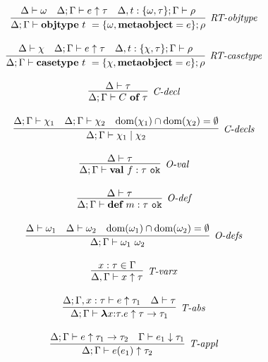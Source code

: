 \begin{figure}
\centering
\[
\begin{array}{c}

\infer[\textit{RT-objtype}]
	{\Delta; \Gamma \vdash  \keyw{objtype}~ t~=\{{\omega}, \keyw{metaobject}=e\}; \rho} 
	{\Delta \vdash \omega & \Delta; \Gamma \vdash e \uparrow\tau & \Delta, t:\{\omega,\tau\}; \Gamma \vdash \rho }\\[3ex]

\infer[\textit{RT-casetype}]
	{\Delta; \Gamma \vdash  \keyw{casetype}~ t~=\{\chi, \keyw{metaobject}=e\}; \rho} 
	{\Delta \vdash \chi & \Delta; \Gamma \vdash e \uparrow\tau & \Delta, t:\{\chi,\tau\}; \Gamma \vdash \rho  }\\[3ex]

\infer[\textit{C-decl}]
	{\Delta; \Gamma \vdash  C~\keyw{of}~\tau} 
	{\Delta \vdash \tau   }\\[3ex]

\infer[\textit{C-decls}]
	{\Delta; \Gamma \vdash  \chi_1 \bnfalt \chi_2} 
	{\Delta; \Gamma \vdash \chi_1 & \Delta; \Gamma \vdash \chi_2 & \text{dom}(\chi_1) \intersect \text{dom}(\chi_2) = \emptyset}\\[3ex]

\infer[\textit{O-val}]
	{\Delta; \Gamma \vdash \keyw{val}~ f:\tau \ \texttt{ok} }
	{\Delta \vdash \tau} \\[3ex]
	
\infer[\textit{O-def}]
	{\Delta; \Gamma \vdash \keyw{def}~ m:\tau \ \texttt{ok} }
	{\Delta \vdash \tau } \\[3ex]

\infer[\textit{O-defs}]
	{\Delta; \Gamma \vdash \omega_1\ \omega_2  }
	{\Delta \vdash \omega_1 & \Delta \vdash \omega_2 & \text{dom}(\omega_1) \intersect \text{dom}(\omega_2) = \emptyset } \\[3ex]
	
\infer[\textit{T-varx}]
	{\Delta,\Gamma \vdash x\uparrow\tau } 
	{x:\tau \in \Gamma }\\[3ex]

\infer[\textit{T-abs}]
	{\Delta; \Gamma \vdash  \boldsymbol\lambda x{:}\tau . e \uparrow \tau \rightarrow \tau_1} 
	{\Delta; \Gamma, x:\tau \vdash e\uparrow\tau_1  & \Delta\vdash \tau}\\[3ex]

\infer[\textit{T-appl}]
	{\Delta; \Gamma \vdash  e(e_1) \uparrow\tau_2} 
	{\Delta; \Gamma \vdash e \uparrow \tau_1 \rightarrow \tau_2 & \Gamma \vdash e_1 \downarrow \tau_1}\\[3ex]


\end{array}\]
\end{figure}
